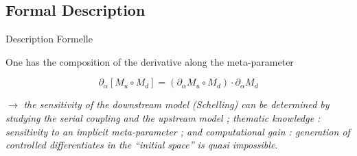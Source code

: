 






\subsection{Formal Description}{Description Formelle}


One has the composition of the derivative along the meta-parameter

\[
\partial_{\alpha}\left[M_u \circ M_d\right] = \left(\partial_{\alpha} M_u \circ M_d \right)\cdot \partial_{\alpha} M_d
\]

$\rightarrow$ \textit{the sensitivity of the downstream model (Schelling) can be determined by studying the serial coupling and the upstream model ; thematic knowledge : sensitivity to an implicit meta-parameter ; and computational gain : generation of controlled differentiates in the ``initial space'' is quasi impossible.}

